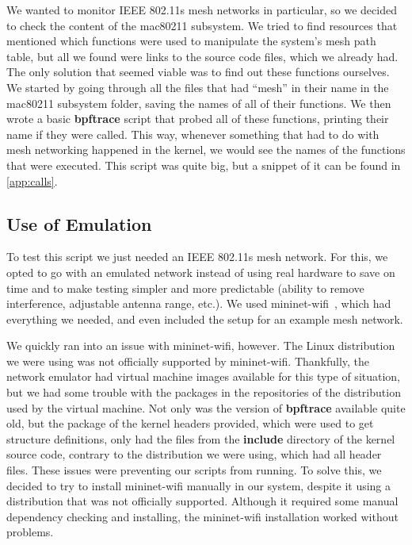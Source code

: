 We wanted to monitor \ac{IEEE} 802.11s mesh networks in particular, so we
decided to check the content of the mac80211 subsystem. We tried to find
resources that mentioned which functions were used to manipulate the system's
mesh path table, but all we found were links to the source code files, which we
already had. The only solution that seemed viable was to find out these
functions ourselves. We started by going through all the files that had ``mesh''
in their name in the mac80211 subsystem folder, saving the names of all of their
functions. We then wrote a basic \textbf{bpftrace} script that probed all of
these functions, printing their name if they were called. This way, whenever
something that had to do with mesh networking happened in the kernel, we would
see the names of the functions that were executed. This script was quite big,
but a snippet of it can be found in \autoref{app:calls}.


\subsection{Use of Emulation}

To test this script we just needed an \ac{IEEE} 802.11s mesh network. For this,
we opted to go with an emulated network instead of using real hardware to save
on time and to make testing simpler and more predictable (ability to remove
interference, adjustable antenna range, etc.). We used
mininet-wifi~\cite{mnwifi}, which had everything we needed, and even included
the setup for an example mesh network.

We quickly ran into an issue with mininet-wifi, however. The Linux distribution
we were using was not officially supported by mininet-wifi. Thankfully, the
network emulator had virtual machine images available for this type of
situation, but we had some trouble with the packages in the repositories of the
distribution used by the virtual machine. Not only was the version of
\textbf{bpftrace} available quite old, but the package of the kernel headers
provided, which were used to get structure definitions, only had the files from
the \textbf{include} directory of the kernel source code, contrary to the
distribution we were using, which had all header files. These issues were
preventing our scripts from running. To solve this, we decided to try to install
mininet-wifi manually in our system, despite it using a distribution that was
not officially supported. Although it required some manual dependency checking
and installing, the mininet-wifi installation worked without problems.


